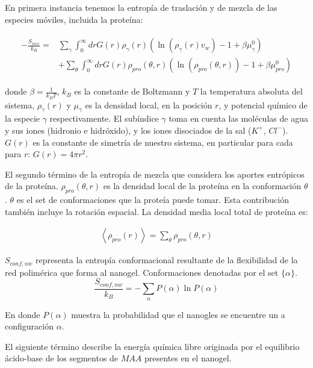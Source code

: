 En primera instancia tenemos la entrop\'ia de traslaci\'on y de mezcla de las especies m\'oviles, incluida la prote\'ina:


\begin{align}
	\begin{aligned}
		-\frac{S_{mix}}{k_B}= &\sum_{\gamma}\int_0^\infty{dr G(r)\rho_\gamma(r)\left(\ln \left(\rho_\gamma (r)v_w\right) -1 + \beta\mu^0_\gamma\right)} \\
		&+ \sum_{\theta}\int_0^\infty{dr G(r)\rho_{pro}(\theta,r)\left(\ln \left(\rho_{pro}(\theta,r)\right) -1 + \beta\mu^0_{pro} \right)}
	\end{aligned}
\end{align}



\noindent donde $\beta = \frac{1}{k_BT}$, $k_B$ es la constante de Boltzmann y $T$ la temperatura absoluta del sistema, $\rho_\gamma(r)$ y $\mu_\gamma$ es la densidad local, en la posición $r$, y potencial qu\'imico de la especie $\gamma$ respectivamente.
El sub\'indice $\gamma$ toma en cuenta las mol\'eculas de agua y sus iones (hidronio e hidr\'oxido), y los iones disociados de la sal ($K^+$, $Cl^-$). $G(r)$ es la constante de simetr\'ia de nuestro sistema, en particular para cada para $r$: $G(r) =4\pi r^2$.

El segundo t\'ermino de la entrop\'ia de mezcla que considera los aportes entr\'opicos de la prote\'ina.
$\rho_{pro}(\theta,r)$ es la densidad local de la prote\'ina en la conformaci\'on  $\theta$.
$\theta$ es el set de conformaciones que la prote\'ia puede tomar.
Esta contribuci\'on tambi\'en incluye la rotación espacial.
La densidad media local total de prote\'ina es: 


\begin{align}
	\left<\rho_{pro}(r)\right> = \sum_\theta{\rho_{pro}(\theta,r)}
\end{align}

$S_{conf,nw}$ representa la entrop\'ia conformacional resultante de la flexibilidad de la red polim\'erica que forma al nanogel. Conformaciones denotadas por el set $\{\alpha\}$. 
\begin{equation}
	\frac{S_{conf,nw}}{k_B} = - \sum_{\alpha}{P(\alpha)\ln P(\alpha)}
\end{equation}

\noindent En donde $P(\alpha)$ muestra la probabilidad que el nanogles se encuentre un a configuraci\'on $\alpha$.

El siguiente t\'ermino describe la energ\'ia qu\'imica libre originada por el equilibrio \'acido-base de los segmentos de $MAA$ presentes en el nanogel.

